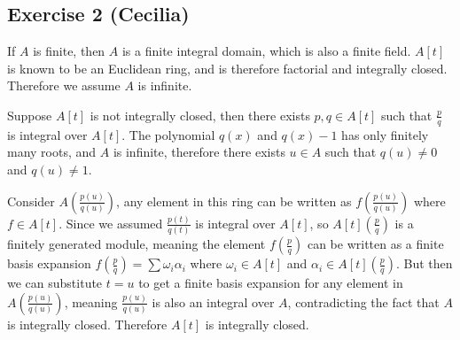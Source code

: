 \subsection*{Exercise 2 (Cecilia)}
If $ A $ is finite, then $ A $ is a finite integral domain, which is also a finite field. $ A[t] $ is known to be an Euclidean ring, and is therefore factorial and integrally closed. Therefore we assume $ A $ is infinite.

Suppose $ A[t] $ is not integrally closed, then there exists $ p, q \in A[t] $ such that $ \frac{p}{q} $ is integral over $ A[t] $. The polynomial $ q(x) $ and $ q(x) - 1 $ has only finitely many roots, and $ A $ is infinite, therefore there exists $ u \in A $ such that $ q(u) \ne 0 $ and $ q(u) \ne 1 $. 

Consider $ A\left(\frac{p(u)}{q(u)}\right) $, any element in this ring can be written as $ f\left(\frac{p(u)}{q(u)}\right) $ where $ f \in A[t] $. Since we assumed $ \frac{p(t)}{q(t)} $ is integral over $ A[t] $, so $ A[t]\left(\frac{p}{q}\right) $ is a finitely generated module, meaning the element $ f\left(\frac{p}{q}\right) $ can be written as a finite basis expansion $ f\left(\frac{p}{q}\right) = \sum \omega_i \alpha_i $ where $ \omega_i \in A[t] $ and $ \alpha_i \in A[t]\left(\frac{p}{q}\right) $. But then we can substitute $ t = u $ to get a finite basis expansion for any element in $ A\left(\frac{p(u)}{q(u)}\right) $, meaning $ \frac{p(u)}{q(u)} $ is also an integral over $ A $, contradicting the fact that $ A $ is integrally closed. Therefore $ A[t] $ is integrally closed.